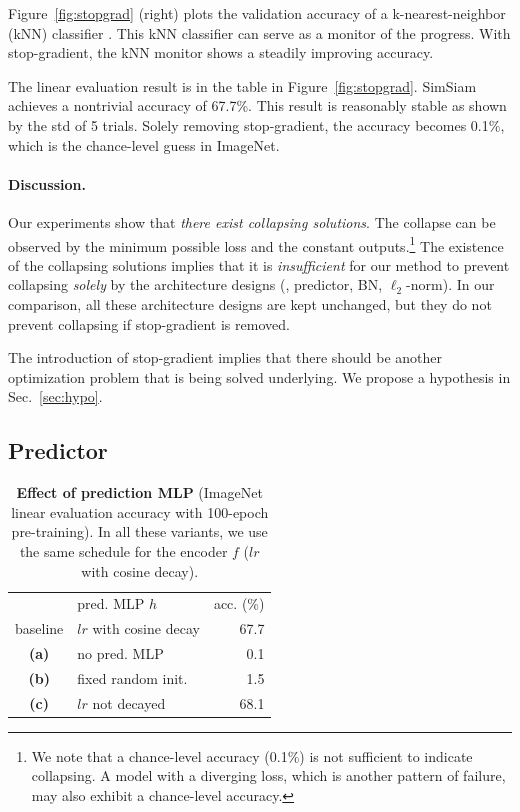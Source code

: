 \documentclass[final]{cvpr}
\newcommand{\tablestyle}[2]{\setlength{\tabcolsep}{#1}\renewcommand{\arraystretch}{#2}\centering\footnotesize}
\begin{document}
Figure~\ref{fig:stopgrad} (right) plots the validation accuracy of a k-nearest-neighbor (kNN) classifier \cite{Wu2018a}. This kNN classifier can serve as a monitor of the progress. With stop-gradient, the kNN monitor shows a steadily improving accuracy.

The linear evaluation result is in the table in Figure~\ref{fig:stopgrad}. SimSiam achieves a nontrivial accuracy of 67.7\%. This result is reasonably stable as shown by the std of 5 trials.
Solely removing stop-gradient, the accuracy becomes 0.1\%, which is the chance-level guess in ImageNet.

\paragraph{Discussion.}
Our experiments show that \emph{there exist collapsing solutions}. 
The collapse can be observed by the minimum possible loss and the constant outputs.\footnote{We note that a chance-level accuracy (0.1\%) is not sufficient to indicate collapsing. A model with a diverging loss, which is another pattern of failure, may also exhibit a chance-level accuracy. }
The existence of the collapsing solutions implies that it is \emph{insufficient} for our method to prevent collapsing \emph{solely} by the architecture designs (\eg, predictor, BN, $\ell_2$-norm). In our comparison, all these architecture designs are kept unchanged, but they do not prevent collapsing if stop-gradient is removed.

The introduction of stop-gradient implies that there should be another optimization problem that is being solved underlying. We propose a hypothesis in Sec.~\ref{sec:hypo}.

\subsection{Predictor} \label{subsec:mlp2}

\begin{table}[t]
\centering
\small
\tablestyle{8pt}{1.1}
\begin{tabular}{cl|r}
& {pred. MLP $h$}  & acc. (\%) \\
\shline
baseline & $lr$ with cosine decay & 67.7 \\
\textbf{(a)} & no pred. MLP & 0.1 \\
\textbf{(b)} & fixed random init. & 1.5 \\
\textbf{(c)} & $lr$ not decayed & 68.1  \\
\end{tabular}
\vspace{.5em}
\caption{\textbf{Effect of prediction MLP}  (ImageNet linear evaluation accuracy with 100-epoch pre-training). In all these variants, we use the same schedule for the encoder $f$ (\mbox{$lr$} with cosine decay). 
\label{tab:mlp2}
}
\end{table}
\end{document}
